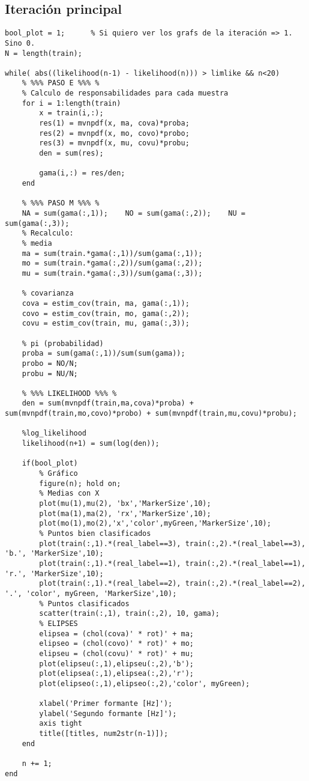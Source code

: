 {}
\subsection*{Iteración principal}

\begin{lstlisting}
bool_plot = 1;		% Si quiero ver los grafs de la iteración => 1. Sino 0.
N = length(train);

while( abs((likelihood(n-1) - likelihood(n))) > limlike && n<20)
	% %%% PASO E %%% %
	% Calculo de responsabilidades para cada muestra
	for i = 1:length(train)
		x = train(i,:);
		res(1) = mvnpdf(x, ma, cova)*proba;
		res(2) = mvnpdf(x, mo, covo)*probo;
		res(3) = mvnpdf(x, mu, covu)*probu;
		den = sum(res);

		gama(i,:) = res/den;
	end

	% %%% PASO M %%% %
	NA = sum(gama(:,1));	NO = sum(gama(:,2));	NU = sum(gama(:,3));
	% Recalculo:
	% media
	ma = sum(train.*gama(:,1))/sum(gama(:,1));
	mo = sum(train.*gama(:,2))/sum(gama(:,2));
	mu = sum(train.*gama(:,3))/sum(gama(:,3));

	% covarianza
	cova = estim_cov(train, ma, gama(:,1));
	covo = estim_cov(train, mo, gama(:,2));
	covu = estim_cov(train, mu, gama(:,3));

	% pi (probabilidad)
	proba = sum(gama(:,1))/sum(sum(gama));
	probo = NO/N;
	probu = NU/N;

	% %%% LIKELIHOOD %%% %
	den = sum(mvnpdf(train,ma,cova)*proba) + sum(mvnpdf(train,mo,covo)*probo) + sum(mvnpdf(train,mu,covu)*probu);

	%log_likelihood
	likelihood(n+1) = sum(log(den));

	if(bool_plot)
		% Gráfico
		figure(n); hold on;
		% Medias con X
		plot(mu(1),mu(2), 'bx','MarkerSize',10);
		plot(ma(1),ma(2), 'rx','MarkerSize',10);
		plot(mo(1),mo(2),'x','color',myGreen,'MarkerSize',10);
		% Puntos bien clasificados
		plot(train(:,1).*(real_label==3), train(:,2).*(real_label==3), 'b.', 'MarkerSize',10);
		plot(train(:,1).*(real_label==1), train(:,2).*(real_label==1), 'r.', 'MarkerSize',10);
		plot(train(:,1).*(real_label==2), train(:,2).*(real_label==2), '.', 'color', myGreen, 'MarkerSize',10);
		% Puntos clasificados
		scatter(train(:,1), train(:,2), 10, gama);
		% ELIPSES
		elipsea = (chol(cova)' * rot)' + ma;
		elipseo = (chol(covo)' * rot)' + mo;
		elipseu = (chol(covu)' * rot)' + mu;
		plot(elipseu(:,1),elipseu(:,2),'b');
		plot(elipsea(:,1),elipsea(:,2),'r');
		plot(elipseo(:,1),elipseo(:,2),'color', myGreen);

		xlabel('Primer formante [Hz]');
		ylabel('Segundo formante [Hz]');
		axis tight
		title([titles, num2str(n-1)]);
	end

	n += 1;
end
\end{lstlisting}

